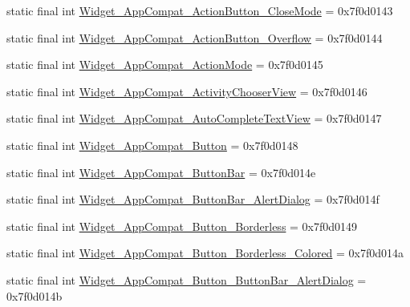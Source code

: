 \begin{DoxyCompactItemize}
\item 
static final int \mbox{\hyperlink{classandroid_1_1support_1_1design_1_1R_1_1style_ac4892bc2668902d80f74ad423544b36f}{Widget\+\_\+\+App\+Compat\+\_\+\+Action\+Button\+\_\+\+Close\+Mode}} = 0x7f0d0143
\item 
static final int \mbox{\hyperlink{classandroid_1_1support_1_1design_1_1R_1_1style_a8eaafdb6030c487a3f7d67fd06e9323d}{Widget\+\_\+\+App\+Compat\+\_\+\+Action\+Button\+\_\+\+Overflow}} = 0x7f0d0144
\item 
static final int \mbox{\hyperlink{classandroid_1_1support_1_1design_1_1R_1_1style_ae00ca1a5ddcb0b444fe407053fda8398}{Widget\+\_\+\+App\+Compat\+\_\+\+Action\+Mode}} = 0x7f0d0145
\item 
static final int \mbox{\hyperlink{classandroid_1_1support_1_1design_1_1R_1_1style_a5a00945d297c6b206b77513c61aa7584}{Widget\+\_\+\+App\+Compat\+\_\+\+Activity\+Chooser\+View}} = 0x7f0d0146
\item 
static final int \mbox{\hyperlink{classandroid_1_1support_1_1design_1_1R_1_1style_a59a59eff9a03b45874ac8f473383f081}{Widget\+\_\+\+App\+Compat\+\_\+\+Auto\+Complete\+Text\+View}} = 0x7f0d0147
\item 
static final int \mbox{\hyperlink{classandroid_1_1support_1_1design_1_1R_1_1style_ab5be18ddf0db368da54bf41e883e3f82}{Widget\+\_\+\+App\+Compat\+\_\+\+Button}} = 0x7f0d0148
\item 
static final int \mbox{\hyperlink{classandroid_1_1support_1_1design_1_1R_1_1style_ad4189a3152639a49105b220b6a35cb39}{Widget\+\_\+\+App\+Compat\+\_\+\+Button\+Bar}} = 0x7f0d014e
\item 
static final int \mbox{\hyperlink{classandroid_1_1support_1_1design_1_1R_1_1style_a1669094c1cf6c300843ff1c554d9d2ba}{Widget\+\_\+\+App\+Compat\+\_\+\+Button\+Bar\+\_\+\+Alert\+Dialog}} = 0x7f0d014f
\item 
static final int \mbox{\hyperlink{classandroid_1_1support_1_1design_1_1R_1_1style_a6f73304db4302454d7a331fddc2d0b53}{Widget\+\_\+\+App\+Compat\+\_\+\+Button\+\_\+\+Borderless}} = 0x7f0d0149
\item 
static final int \mbox{\hyperlink{classandroid_1_1support_1_1design_1_1R_1_1style_a2d2f9169d12a7058fde5ebccb9fdae07}{Widget\+\_\+\+App\+Compat\+\_\+\+Button\+\_\+\+Borderless\+\_\+\+Colored}} = 0x7f0d014a
\item 
static final int \mbox{\hyperlink{classandroid_1_1support_1_1design_1_1R_1_1style_a79f768ac5e0d81d2a2f6f9f64bd7c352}{Widget\+\_\+\+App\+Compat\+\_\+\+Button\+\_\+\+Button\+Bar\+\_\+\+Alert\+Dialog}} = 0x7f0d014b

\end{DoxyCompactItemize}
